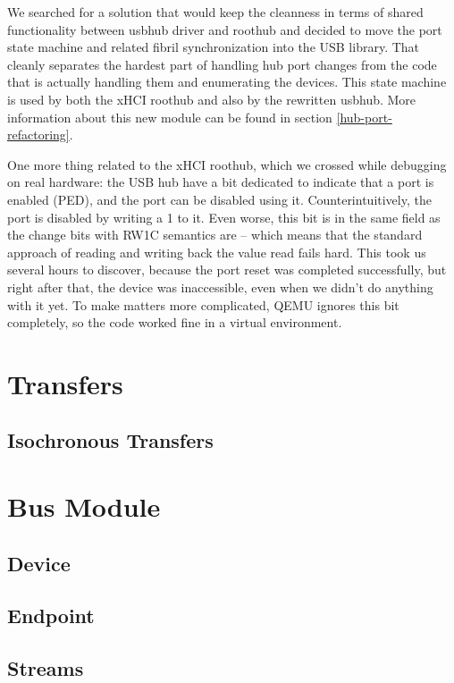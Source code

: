 We searched for a solution that would keep the cleanness in terms of shared
functionality between usbhub driver and roothub and decided to move the port
state machine and related fibril synchronization into the USB library. That
cleanly separates the hardest part of handling hub port changes from the code
that is actually handling them and enumerating the devices. This state machine
is used by both the xHCI roothub and also by the rewritten usbhub. More
information about this new module can be found in section \ref{hub-port-refactoring}.

One more thing related to the xHCI roothub, which we crossed while debugging on
real hardware: the USB hub have a bit dedicated to indicate that a port is
enabled (PED), and the port can be disabled using it. Counterintuitively, the
port is disabled by writing a 1 to it. Even worse, this bit is in the same
field as the change bits with RW1C semantics are -- which means that the
standard approach of reading and writing back the value read fails hard. This
took us several hours to discover, because the port reset was completed
successfully, but right after that, the device was inaccessible, even when we
didn't do anything with it yet. To make matters more complicated, QEMU ignores
this bit completely, so the code worked fine in a virtual environment.


\section{Transfers}
\label{sec:transfers}


\subsection{Isochronous Transfers}


\section{Bus Module}


\subsection{Device}


\subsection{Endpoint}


\subsection{Streams}


